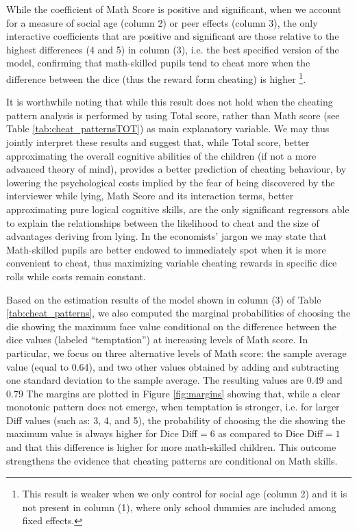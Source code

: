 \documentclass[authoryear, preprint, review, 12pt]{elsarticle}
\begin{document}


While the coefficient of Math Score is positive and significant, when we account for a measure of social age (column 2) or peer effects (column 3), the only interactive coefficients that are positive and significant are those relative to the highest differences (4 and 5) in column (3), i.e. the best specified version of the model,  confirming that math-skilled pupils tend to cheat more when the difference between the dice (thus the reward form cheating) is higher \footnote{This result is weaker when we only control for social age (column 2) and it is not present in column (1), where only school dummies are included among fixed effects.}.

It is worthwhile noting that while this result does not hold when the cheating pattern analysis is performed by using Total score, rather than Math score (see Table \ref{tab:cheat_patternsTOT}) as main explanatory variable. We may thus jointly interpret these results and suggest that, while Total score, better approximating the overall cognitive abilities of the children (if not a more advanced theory of mind), provides a better prediction of cheating behaviour, by lowering the psychological costs implied by the fear of being discovered by the interviewer while lying, Math Score and its interaction terms, better approximating pure logical cognitive skills, are the only significant regressors able to explain the relationships between the likelihood to cheat and the size of advantages deriving from lying. In the economists' jargon we may state that Math-skilled pupils are better endowed to immediately spot when it is more convenient to cheat, thus maximizing variable cheating rewards in specific dice rolls while costs remain constant.



Based on the estimation results of the model shown in column (3) of Table \ref{tab:cheat_patterns}, we also computed the marginal probabilities of choosing the die showing the maximum face value conditional on the difference between the dice values (labeled \enquote{temptation}) at increasing levels of Math score. In particular, we focus on three alternative levels of Math score: the sample average value (equal to 0.64), and two other values obtained by adding and subtracting one standard deviation to the sample average. The resulting values are 0.49 %
and 0.79 %
The margins are plotted in Figure \ref{fig:margins} showing that, while a clear monotonic pattern does not emerge, when temptation is stronger, i.e. for larger Diff values (such as: 3, 4, and 5), the probability of choosing the die showing the maximum value
is always higher for Dice Diff$=6$ as compared to Dice Diff$=1$ and that this difference is higher for more math-skilled children.
This outcome strengthens the evidence that cheating patterns are conditional on Math skills.
\end{document}
